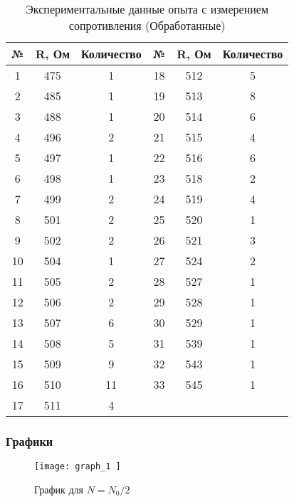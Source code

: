 \begin{center}
	\begin{longtable}{|c|c|c||c|c|c|}
		\caption[Экспериментальные данные]{Экспериментальные данные опыта с измерением сопротивления (Обработанные)} \label{ap:table:3} \\
		\hline
		\multicolumn{1}{|c|}{\textbf{№}} &
		\multicolumn{1}{c|}{\textbf{R, Ом}} & 
		\multicolumn{1}{c||}{\textbf{Количество}} &
		\multicolumn{1}{c|}{\textbf{№}} &
		\multicolumn{1}{c|}{\textbf{R, Ом}} & 
		\multicolumn{1}{c|}{\textbf{Количество}} \\ \hline
		\endfirsthead
		
		1  & 475 & 1  & 18 & 512 & 5 \\ \hline
		2  & 485 & 1  & 19 & 513 & 8 \\ \hline
		3  & 488 & 1  & 20 & 514 & 6 \\ \hline
		4  & 496 & 2  & 21 & 515 & 4 \\ \hline
		5  & 497 & 1  & 22 & 516 & 6 \\ \hline
		6  & 498 & 1  & 23 & 518 & 2 \\ \hline
		7  & 499 & 2  & 24 & 519 & 4 \\ \hline
		8  & 501 & 2  & 25 & 520 & 1 \\ \hline
		9  & 502 & 2  & 26 & 521 & 3 \\ \hline
		10 & 504 & 1  & 27 & 524 & 2 \\ \hline
		11 & 505 & 2  & 28 & 527 & 1 \\ \hline
		12 & 506 & 2  & 29 & 528 & 1 \\ \hline
		13 & 507 & 6  & 30 & 529 & 1 \\ \hline
		14 & 508 & 5  & 31 & 539 & 1 \\ \hline
		15 & 509 & 9  & 32 & 543 & 1 \\ \hline
		16 & 510 & 11 & 33 & 545 & 1 \\ \hline
		17 & 511 & 4  &    &     &   \\ \hline
		
		
	\end{longtable}
\end{center}

\newpage

\subsubsection{Графики} \label{pril_practic_graph}

\begin{figure} [H]
	\centering
	\texttt{[image:  graph\_1 ]} 
	\caption{График для $N = N_0/2$}
	
	 \label{fig:graph-1}
\end{figure}

